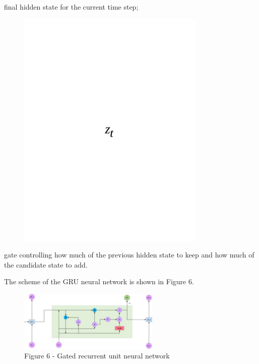 final hidden state for the current time step;
\begin{figure}[H]
	\centering
	\includegraphics[width=0.8\textwidth]{media/ict/image78}
	\caption*{}
\end{figure}

gate controlling how much of the previous hidden state to keep and how
much of the candidate state to add.

The scheme of the GRU neural network is shown in Figure 6.

\begin{figure}[H]
	\centering
	\includegraphics[width=0.6\textwidth]{media/ict/image79}
	\caption*{Figure 6 - Gated recurrent unit neural network}
\end{figure}

